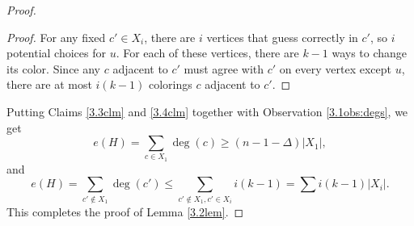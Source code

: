 \documentclass[10pt,a4paper]{amsart}
\begin{document}
\begin{proof}
\begin{proof}
    
    For any fixed $c' \in X_i$, there are $i$ vertices that guess correctly in $c'$, so $i$ potential choices for $u$. For each of these vertices, there are $k-1$ ways to change its color. Since any $c$ adjacent to $c'$ must agree with $c'$ on every vertex except $u$, there are at most $i(k-1)$ colorings $c$ adjacent to $c'$. %
\end{proof}

Putting Claims \ref{3.3clm} and \ref{3.4clm} together with Observation \ref{3.1obs:degs}, we get %
$$e(H)=\sum_{c\in X_1}  \deg (c)\geq (n-1-\Delta)|X_1|,$$ and $$e(H)=\sum_{c' \notin X_1} \deg(c')\leq \sum _{c' \notin X_1, c' \in X_i} i(k-1)=\sum i(k-1)|X_i|.$$
This completes the proof of Lemma \ref{3.2lem}.
\end{proof}
\end{document}
